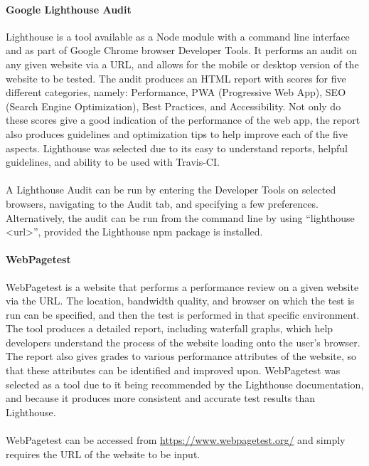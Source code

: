 \documentclass[a4paper, 11pt]{article}
\begin{document}
            \paragraph{Google Lighthouse Audit}
            Lighthouse is a tool available as a Node module with a command line interface and as part of Google Chrome browser Developer Tools. It performs an audit on any given website via a URL, and allows for the mobile or desktop version of the website to be tested. The audit produces an HTML report with scores for five different categories, namely: Performance, PWA (Progressive Web App), SEO (Search Engine Optimization), Best Practices, and Accessibility. Not only do these scores give a good indication of the performance of the web app, the report also produces guidelines and optimization tips to help improve each of the five aspects. Lighthouse was selected due to its easy to understand reports, helpful guidelines, and ability to be used with Travis-CI.
            \paragraph{}
            A Lighthouse Audit can be run by entering the Developer Tools on selected browsers, navigating to the Audit tab, and specifying a few preferences. Alternatively, the audit can be run from the command line by using “lighthouse <url>”, provided the Lighthouse npm package is installed.
            
            \paragraph{WebPagetest}
            WebPagetest is a website that performs a performance review on a given website via the URL. The location, bandwidth quality, and browser on which the test is run can be specified, and then the test is performed in that specific environment. The tool produces a detailed report, including waterfall graphs, which help developers understand the process of the website loading onto the user’s browser. The report also gives grades to various performance attributes of the website, so that these attributes can be identified and improved upon. WebPagetest was selected as a tool due to it being recommended by the Lighthouse documentation, and because it produces more consistent and accurate test results than Lighthouse.
            \paragraph{}
            WebPagetest can be accessed from \url{https://www.webpagetest.org/} and simply requires the URL of the website to be input.
            
\end{document}
